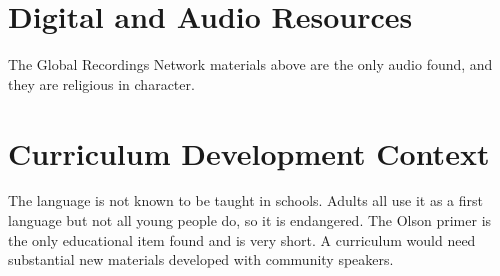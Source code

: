 \documentclass[12pt]{article}
\begin{document}
\section{Digital and Audio Resources}
The Global Recordings Network materials above are the only audio found, and they are religious in character.

\section{Curriculum Development Context}
The language is not known to be taught in schools. Adults all use it as a first language but not all young people do, so it is endangered. The Olson primer is the only educational item found and is very short. A curriculum would need substantial new materials developed with community speakers.
\end{document}
